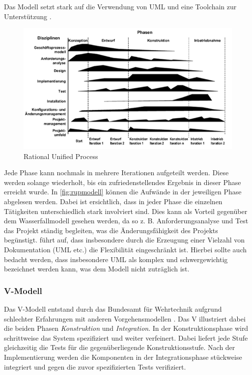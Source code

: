 Das Modell setzt stark auf die Verwendung von UML und eine Toolchain zur Unterstützung \parencite[vgl.][]{Kruchten:2002:TIR:581339.581455}.

\begin{figure}
  \centering
  \includegraphics[width=\textwidth]{img/rupmodell.png}
  \caption{Rational Unified Process \parencite[][S. 40]{Kleuker:2011aa}}
  \label{fig:rupmodell}
\end{figure}

Jede Phase kann nochmals in mehrere Iterationen aufgeteilt werden. 
Diese werden solange wiederholt, bis ein zufriedenstellendes Ergebnis in dieser Phase erreicht wurde.
In \autoref{fig:rupmodell} können die Aufwände in der jeweiligen Phase abgelesen werden. 
Dabei ist ersichtlich, dass in jeder Phase die einzelnen Tätigkeiten unterschiedlich stark involviert sind.
Dies kann als Vorteil gegenüber dem Wasserfallmodell gesehen werden, da so z. B. Anforderungsanalyse und Test das Projekt ständig begleiten, was die Änderungsfähigkeit des Projekts begünstigt.
\parencite[][S. 60]{Schatten:2010aa} führt auf, dass insbesondere durch die Erzeugung einer Vielzahl von Dokumentation (UML etc.) die Flexibilität eingeschränkt ist.
Hierbei sollte auch bedacht werden, dass insbesondere UML als komplex und schwergewichtig bezeichnet werden kann, was dem Modell nicht zuträglich ist.

\subsubsection{V-Modell} \label{sec:vmodell}

Das V-Modell entstand durch das Bundesamt für Wehrtechnik aufgrund schlechter Erfahrungen mit anderen Vorgehensmodellen \parencite[vgl.][S. 1]{droschel2000v}.
Das V illustriert dabei die beiden Phasen \emph{Konstruktion} und \emph{Integration}.
In der Konstruktionsphase wird schrittweise das System spezifiziert und weiter verfeinert. 
Dabei liefert jede Stufe gleichzeitig die Tests für die gegenüberliegende Konstruktionsstufe.
Nach der Implementierung werden die Komponenten in der Integrationsphase stückweise integriert und gegen die zuvor spezifizierten Tests verifiziert.

